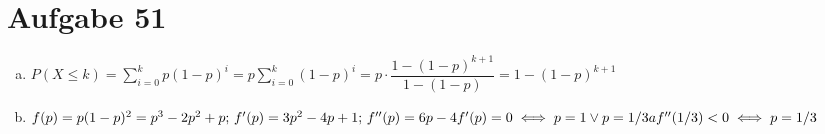 \section{Aufgabe 51}
\setcounter{section}{51}

\begin{enumerate}[(a)]
    \item $P(X \leq k) = \sum_{i = 0}^kp(1 - p)^i = p\sum_{i = 0}^k(1 - p)^i = p \cdot \dfrac{1 - (1 - p)^{k + 1}}{1 - (1 - p)} = 1 - (1 - p)^{k + 1}$
    \item $f(p) = p(1 - p)^2 = p^3 - 2p^2 + p\text{;  } f'(p) = 3p^2 - 4p + 1\text{;  } f''(p) = 6p - 4 \\[5pt]
            f'(p) = 0 \iff p = 1 \lor p = 1/3a \\[5pt]
            f''(1/3) < 0 \iff p = 1/3$
\end{enumerate}
